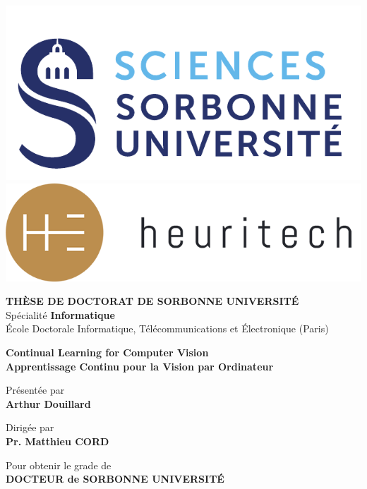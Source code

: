 \begin{titlepage}

  \vspace*{-2.5cm}
  \includegraphics[height=0.15\columnwidth]{images/sorbonne}
  \hspace*{2.5cm}
  \includegraphics[height=0.10\columnwidth]{images/heuritech}
  \vspace*{0.5cm}

  \begin{center}

    {\large \textbf{T\normalsize{HÈSE DE}\large{} D\normalsize{OCTORAT DE}\large{} S\normalsize{ORBONNE}\large{} U\normalsize{NIVERSITÉ}}}\\
    Spécialité \textbf{Informatique}\\
    École Doctorale Informatique, Télécommunications et Électronique (Paris)

    \vspace*{1.5cm}

    {\Large \textbf{Continual Learning for Computer Vision}} \\[0.5em]
    {\large \textbf{Apprentissage Continu pour la Vision par Ordinateur}}

    \vspace*{1.2cm}

    Présentée par\\
    {\large \textbf{Arthur {Douillard}}}

    \vspace*{2mm}

    Dirigée par\\
    \textbf{Pr. Matthieu {CORD}}

    \vspace*{5mm}

    Pour obtenir le grade de \ \\
    \textbf{DOCTEUR de SORBONNE UNIVERSITÉ} \ \\

    \vspace*{5mm}

  \end{center}


\end{titlepage}

